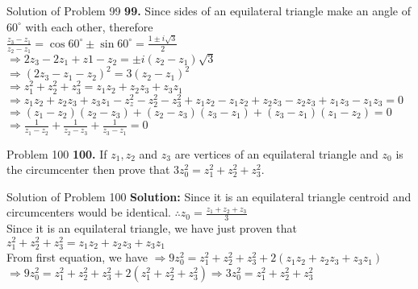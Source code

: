 \documentclass[aspectratio=169,8pt]{beamer}
\begin{document}
\begin{frame}{Solution of Problem 99}
  \textbf{99.} Since sides of an equilateral triangle make an angle of $60^\circ$ with each other, therefore\\
  \vspace*{0.2cm}
  $\frac{z_3 - z_1}{z_2 - z_1} = \cos60^\circ \pm \sin60^\circ = \frac{1 \pm i\sqrt{3}}{2}$\\
  \vspace*{0.2cm}
  $\Rightarrow 2z_3 - 2z_1 + z1 - z_2 = \pm i(z_2 - z_1)\sqrt{3}$\\
  \vspace*{0.2cm}
  $\Rightarrow (2z_3 - z_1 - z_2)^2 = 3(z_2 - z_1)^2$\\
  \vspace*{0.2cm}
  $\Rightarrow z_1^2 + z_2^2 + z_3^2 = z_1z_2 + z_2z_3 +z_3z_1$\\
  \vspace*{0.2cm}
  $\Rightarrow z_1z_2 + z_2z_3 + z_3z_1 - z_z^2 - z_2^2 - z_3^2 + z_1z_2 - z_1z_2 + z_2z_3 - z_2z_3 + z_1z_3 - z_1z_3 = 0$\\
  \vspace*{0.2cm}
  $\Rightarrow (z_1 - z_2)(z_2 - z_3) + (z_2 - z_3)(z_3 - z_1) + (z_3 - z_1)(z_1 - z_2) = 0$\\
  \vspace*{0.2cm}
  $\Rightarrow \frac{1}{z_1 - z_2} + \frac{1}{z_2 - z_3} + \frac{1}{z_3 - z_1} = 0$
\end{frame}
\begin{frame}{Problem 100}
  \textbf{100.} If $z_1, z_2$ and $z_3$ are vertices of an equilateral triangle and $z_0$ is the circumcenter then prove that
  $3z_0^2 = z_1^2 + z_2^2 + z_3^2.$
\end{frame}
\begin{frame}{Solution of Problem 100}
  \textbf{Solution:} Since it is an equilateral triangle centroid and circumcenters would be identical. $\therefore z_0 = \frac{z_1
    + z_2 + z_3}{3}$\\
  \vspace*{0.2cm}
  Since it is an equilateral triangle, we have just proven that $z_1^2 + z_2^2 + z_3^2 = z_1z_2 + z_2z_3 +z_3z_1$\\
  \vspace*{0.2cm}
  From first equation, we have $\Rightarrow 9z_0^2 = z_1^2 + z_2^2 + z_3^2 + 2(z_1z_2 + z_2z_3 +z_3z_1)$\\
  \vspace*{0.2cm}
  $\Rightarrow 9z_0^2 = z_1^2 + z_2^2 + z_3^2 + 2(z_1^2 + z_2^2 + z_3^2)\Rightarrow 3z_0^2 = z_1^2 + z_2^2 + z_3^2$
\end{frame}
\end{document}
